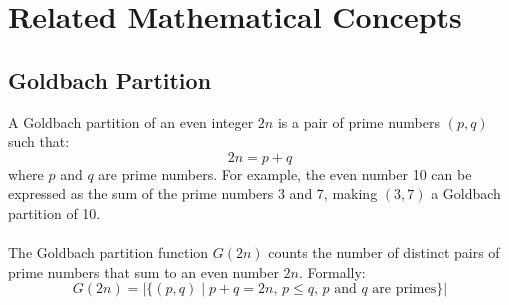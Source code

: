 \documentclass[a4paper, 12pt]{article}
\begin{document}
\section{Related Mathematical Concepts}

\subsection{Goldbach Partition}
A Goldbach partition of an even integer \( 2n \) is a pair of prime numbers \( (p, q) \) such that:
\begin{equation}
2n = p + q
\end{equation}
where \( p \) and \( q \) are prime numbers. For example, the even number 10 can be expressed as the sum of the prime numbers 3 and 7, making \( (3, 7) \) a Goldbach partition of 10.
\\\\
The Goldbach partition function \( G(2n) \) counts the number of distinct pairs of prime numbers that sum to an even number \( 2n \). Formally:
$$G(2n) = \left| \{ (p, q) \mid p + q = 2n, \, p \leq q, \, p \text{ and } q \text{ are primes} \} \right|$$
\end{document}
